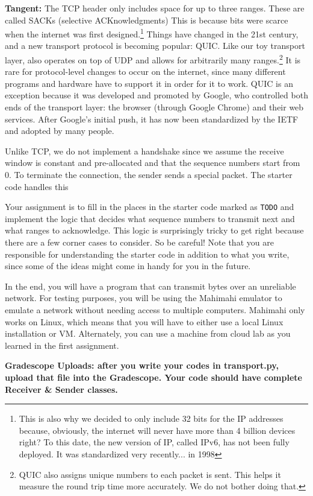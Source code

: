 \documentclass{article}
\begin{document}
\noindent\textbf{Tangent:} The TCP header only includes space for up to three ranges. These are called SACKs (selective ACKnowledgments) This is because bits were scarce when the internet was first designed.\footnote{This is also why we decided to only include 32 bits for the IP addresses because, obviously, the internet will never have more than 4 billion devices right? To this date, the new version of IP, called IPv6, has not been fully deployed. It was standardized very recently... in 1998} Things have changed in the 21st century, and a new transport protocol is becoming popular: QUIC. Like our toy transport layer, also operates on top of UDP and allows for arbitrarily many ranges.\footnote{QUIC also assigns unique numbers to each packet is sent. This helps it measure the round trip time more accurately. We do not bother doing that.} It is rare for protocol-level changes to occur on the internet, since many different programs and hardware have to support it in order for it to work. QUIC is an exception because it was developed and promoted by Google, who controlled both ends of the transport layer: the browser (through Google Chrome) and their web services. After Google's initial push, it has now been standardized by the IETF and adopted by many people.

Unlike TCP, we do not implement a handshake since we assume the receive window is constant and pre-allocated and that the sequence numbers start from 0. To terminate the connection, the sender sends a special packet. The starter code handles this

Your assignment is to fill in the places in the starter code marked as {\tt TODO} and implement the logic that decides what sequence numbers to transmit next and what ranges to acknowledge. This logic is surprisingly tricky to get right because there are a few corner cases to consider. So be careful! Note that you are responsible for understanding the starter code in addition to what you write, since some of the ideas might come in handy for you in the future.

In the end, you will have a program that can transmit bytes over an unreliable network. For testing purposes, you will be using the Mahimahi emulator to emulate a network without needing access to multiple computers. Mahimahi only works on Linux, which means that you will have to either use a local Linux installation or VM. Alternately, you can use a machine from cloud lab as you learned in the first assignment.

\begin{comment}
  Assignment plan
  - 1 Connect to cloud lab. Use netcat to connect to example.com and download the HTML. Do the same by using python sockets. Using sockets, create a very very simple python web server that compares input to a given string and response
  - 2 Create a transport layer that uses UDP to send packets
  - 3 Implement a routing algorithm
  - 4 Play with wireshark. Inspect ARP packets, TCP packets, and try to follow HTTP connections. See what others in your wifi network are using. Can you read their private messages? Why not?
  - 5 Secure communication over the internet
\end{comment}

\noindent\textbf{Gradescope Uploads: after you write your codes in transport.py, upload that file into the Gradescope. Your code should have complete Receiver & Sender classes.}
\end{document}
